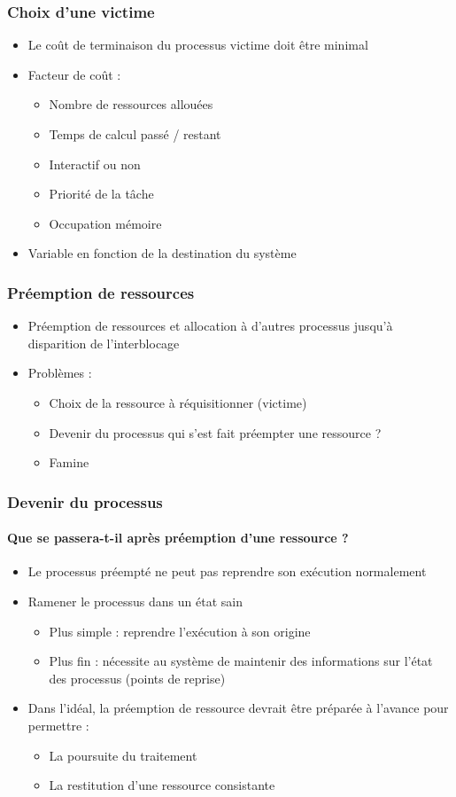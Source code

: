 \begin{frame}
\frametitle{Choix d’une victime}
\begin{itemize}
\item <1->Le coût de terminaison du processus victime doit être minimal
\item <2->Facteur de coût :
\begin{itemize}
\item Nombre de ressources allouées
\item Temps de calcul passé / restant
\item Interactif ou non
\item Priorité de la tâche
\item Occupation mémoire
\end{itemize}
\item <3->Variable en fonction de la destination du système
\end{itemize}
\end{frame}

\begin{frame}
\frametitle{Préemption de ressources}
\begin{itemize}
\item <1->Préemption de ressources et allocation à d’autres processus jusqu’à disparition de l’interblocage
\item <2->Problèmes :
\begin{itemize}
\item Choix de la ressource à réquisitionner (victime)
\item Devenir du processus qui s’est fait préempter une ressource ?
\item Famine
\end{itemize}
\end{itemize}
\end{frame}

\begin{frame}
\frametitle{Devenir du processus}
\framesubtitle{Que se passera-t-il après préemption d’une ressource ?}
\begin{itemize}
\item <1->Le processus préempté ne peut pas reprendre son exécution normalement
\item <2->Ramener le processus dans un état sain
\begin{itemize}
\item Plus simple : reprendre l’exécution à son origine
\item Plus fin : nécessite au système de maintenir des informations sur l’état des processus (points de reprise)
\end{itemize}
\item <3->Dans l'idéal, la préemption de ressource devrait être préparée à l'avance pour permettre :
\begin{itemize}
\item La poursuite du traitement
\item La restitution d'une ressource consistante
\end{itemize}
\end{itemize}
\end{frame}

